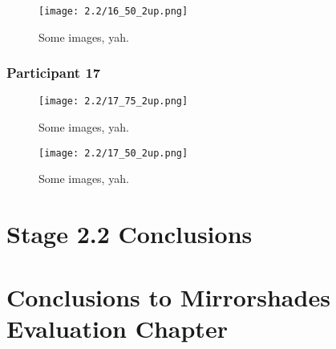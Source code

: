 \clearpage

\begin{figure}[h]
	\begin{center}
	\texttt{[image: 2.2/16\_50\_2up.png]}
	\caption{Some images, yah.}
	\end{center}
\end{figure}


\clearpage

\subsubsection{Participant 17}

\begin{figure}[h]
	\begin{center}
	\texttt{[image: 2.2/17\_75\_2up.png]}
	\caption{Some images, yah.}
	\end{center}
\end{figure}

\clearpage

\begin{figure}[h]
	\begin{center}
	\texttt{[image: 2.2/17\_50\_2up.png]}
	\caption{Some images, yah.}
	\end{center}
\end{figure}


\section{Stage 2.2 Conclusions}


\section{Conclusions to Mirrorshades Evaluation Chapter}


